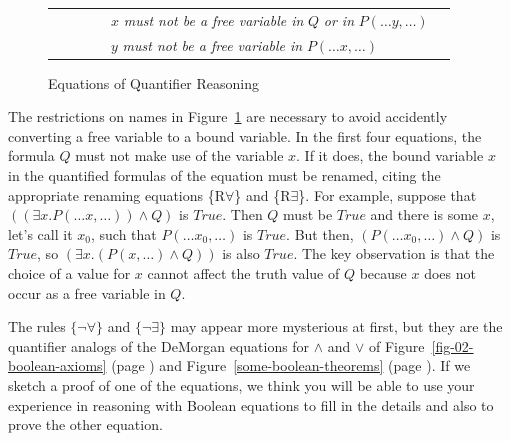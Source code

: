 {\begin{figure}
\begin{center}
\begin{tabular}{ll}
~~~~~~~~$x$ \emph{must not be a free variable in} $Q$ \emph{or in} $P(\dots y, \dots)$     & \\
~~~~~~~~$y$ \emph{must not be a free variable in} $P(\dots x, \dots)$                      & \\
\end{tabular}
\end{center}
\caption{Equations of Quantifier Reasoning}
\label{fig-02-quantifiers}
\end{figure}

The restrictions on names in Figure~\ref{fig-02-quantifiers} are necessary to avoid
accidently converting a free variable to a bound variable.
In the first four equations, the formula $Q$ must not make use of the variable $x$.
If it does, the bound variable $x$ in the quantified formulas of the equation
must be renamed, citing the appropriate renaming equations \{R$\forall$\} and \{R$\exists$\}.
For example,
suppose that $((\exists x.P(\dots x, \dots)) \wedge Q)$ is $True$.
Then $Q$ must be $True$ and there is
some $x$, let's call it $x_0$, such that $P(\dots x_0, \dots)$ is $True$.
But then, $(P(\dots x_0,\dots) \wedge Q)$
is $True$, so $(\exists x.(P(x, \dots) \wedge Q))$ is also $True$.
The key observation is that the choice of a value for $x$
cannot affect the truth value of $Q$ because $x$ does
not occur as a free variable in $Q$.

\label{why-neg-forall}
The rules $\{\neg\forall\}$ and $\{\neg\exists\}$ may appear more mysterious at first,
but they are the quantifier analogs of the DeMorgan equations for $\wedge$ and $\vee$
of Figure~\ref{fig-02-boolean-axioms} (page \pageref{fig-02-boolean-axioms})
and Figure~\ref{some-boolean-theorems} (page \pageref{some-boolean-theorems}).
If we sketch a proof of one of the equations, we think you will be able
to use your experience in reasoning with Boolean equations to fill in the details
and also to prove the other equation.

}
